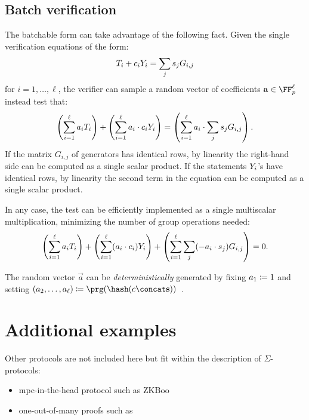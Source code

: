 \documentclass[11pt]{article}
\begin{document}
\subsection{Batch verification}

The batchable form can take advantage of the following fact.
Given the single verification equations of the form:
\[
   T_i + c_i Y_i = \sum_j s_j G_{i,j}
\]
for $i=1, \dots,\ell$,
the verifier can sample a random vector of coefficients $\vec a \in \FF_p^\ell$ instead test that:
\[
  \left(\sum_{i=1}^{\ell} a_i T_i\right) + \left(\sum_{i=1}^{\ell} a_i \cdot  c_i Y_i \right) = \left(\sum_{i=1}^{\ell} a_i \cdot \sum_j s_j G_{i,j}\right).
\]
If the matrix $G_{i, j}$ of generators has identical rows, by linearity the right-hand side can be computed as a single scalar product.
If the statements $Y_i$'s have identical rows, by linearity the second term in the equation can be computed as a single scalar product.

In any case, the test can be efficiently implemented as a single multiscalar multiplication, minimizing the number of group operations needed:
\[
  \left(\sum_{i=1}^{\ell} a_i T_i\right) + \left(\sum_{i=1}^{\ell} (a_i \cdot  c_i) Y_i \right) + \left(\sum_{i=1}^{\ell}\sum_j (-a_i \cdot  s_j) G_{i,j}\right) = 0.
\]

The random vector $\vec a$ can be \emph{deterministically} generated by fixing $a_1 \coloneqq 1$ and setting $(a_2, \dots, a_{\ell}) \defeq \prg(\hash(\challenge \concat \vec s))$~\cite{bip-schnorr}.

\section{Additional examples}

Other protocols are not included here but fit within the description
of $\Sigma$-protocols:
\begin{itemize}
\item mpc-in-the-head protocol such as ZKBoo~\cite{USENIX:GiaMadOrl16}
\item one-out-of-many proofs such as~\cite{EC:GroKoh15}
\end{itemize}
\end{document}
